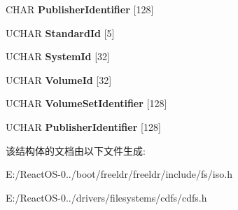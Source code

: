 \begin{DoxyCompactItemize}
C\+H\+AR {\bfseries Publisher\+Identifier} \mbox{[}128\mbox{]}
\item 
\mbox{\label{struct___p_v_d_a548c85ab15c23c2ec448095a978b454c}} 
U\+C\+H\+AR {\bfseries Standard\+Id} \mbox{[}5\mbox{]}
\item 
\mbox{\label{struct___p_v_d_aff78f5888a09c19830b30a6834bab44b}} 
U\+C\+H\+AR {\bfseries System\+Id} \mbox{[}32\mbox{]}
\item 
\mbox{\label{struct___p_v_d_abdf6c4163639ef57f3c3612a0f9397d3}} 
U\+C\+H\+AR {\bfseries Volume\+Id} \mbox{[}32\mbox{]}
\item 
\mbox{\label{struct___p_v_d_a2e9824d52a532632b18a04cc87b12e90}} 
U\+C\+H\+AR {\bfseries Volume\+Set\+Identifier} \mbox{[}128\mbox{]}
\item 
\mbox{\label{struct___p_v_d_a31f0215f6b64348aea2b67216c5cbcc7}} 
U\+C\+H\+AR {\bfseries Publisher\+Identifier} \mbox{[}128\mbox{]}
\end{DoxyCompactItemize}


该结构体的文档由以下文件生成\+:\begin{DoxyCompactItemize}
\item 
E\+:/\+React\+O\+S-\/0../boot/freeldr/freeldr/include/fs/iso.\+h\item 
E\+:/\+React\+O\+S-\/0../drivers/filesystems/cdfs/cdfs.\+h\end{DoxyCompactItemize}
